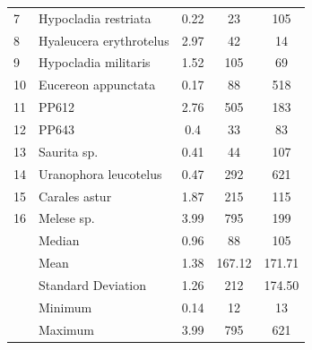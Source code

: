\documentclass[12pt,a4paper]{article}
\begin{document}
\begin{table}[p]
\begin{tabular}{llccc}
	7  & Hypocladia restriata           & 0.22                                                         & 23                                                 & 105                                                             \\
	8  & Hyaleucera erythrotelus        & 2.97                                                         & 42                                                 & 14                                                              \\
	9  & Hypocladia militaris           & 1.52                                                         & 105                                                & 69                                                              \\
	10 & Eucereon appunctata            & 0.17                                                         & 88                                                 & 518                                                             \\
	11 & PP612                          & 2.76                                                         & 505                                                & 183                                                             \\
	12 & PP643                          & 0.4                                                          & 33                                                 & 83                                                              \\
	13 & Saurita sp.                    & 0.41                                                         & 44                                                 & 107                                                             \\
	14 & Uranophora leucotelus          & 0.47                                                         & 292                                                & 621                                                             \\
	15 & Carales astur                  & 1.87                                                         & 215                                                & 115                                                             \\
	16 & Melese sp.                     & 3.99                                                         & 795                                                & 
	199           \\ \hline
	& Median & 0.96	& 88	& 105 \\
	& Mean & 1.38	& 167.12 &	171.71 \\
	& Standard Deviation & 1.26	& 212 &	174.50 \\
	& Minimum & 0.14	& 12	& 13 \\
	& Maximum & 3.99 &	795	& 621
	
	
	                                                
\end{tabular}
\end{table}
\end{document}
